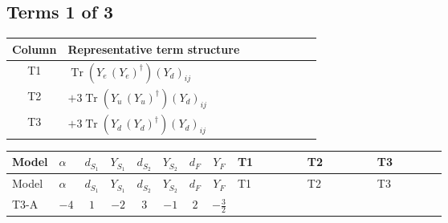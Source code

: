\documentclass[8pt]{article}
\begin{document}
\begin{landscape}
\subsection*{Terms 1 of 3}
\begin{center}
\begin{tabular}{@{}c >{\raggedright\arraybackslash}p{0.82\linewidth}@{}}
\toprule
Column & Representative term structure \\
\midrule
T1 & \(\displaystyle \operatorname{Tr}\!\left({Y_e}\,\left({Y_e}\right)^{\dagger}\right) \left({Y_d}\right)_{ij}\) \\
\midrule
T2 & \(\displaystyle +3 \operatorname{Tr}\!\left({Y_u}\,\left({Y_u}\right)^{\dagger}\right) \left({Y_d}\right)_{ij}\) \\
\midrule
T3 & \(\displaystyle +3 \operatorname{Tr}\!\left({Y_d}\,\left({Y_d}\right)^{\dagger}\right) \left({Y_d}\right)_{ij}\) \\
\midrule
\bottomrule
\end{tabular}
\end{center}
\smallskip
\tiny
\begin{longtable}{@{}llcccccc >{\raggedright\arraybackslash}p{0.21\linewidth} >{\raggedright\arraybackslash}p{0.21\linewidth} >{\raggedright\arraybackslash}p{0.21\linewidth}@{}}
\toprule
Model & $\alpha$ & $d_{S_1}$ & $Y_{S_1}$ & $d_{S_2}$ & $Y_{S_2}$ & $d_F$ & $Y_F$ & T1 & T2 & T3 \\
\midrule
\endfirsthead
\toprule
Model & $\alpha$ & $d_{S_1}$ & $Y_{S_1}$ & $d_{S_2}$ & $Y_{S_2}$ & $d_F$ & $Y_F$ & T1 & T2 & T3 \\
\midrule
\endhead
T3-A & $-4$ & $1$ & $-2$ & $3$ & $-1$ & $2$ & $-\frac{3}{2}$ & \scriptsize\adjustbox{max width=\linewidth}{$\begin{gathered} \operatorname{Tr}\!\left({Y_e}\,\left({Y_e}\right)^{\dagger}\right) \left({Y_d}\right)_{ij}\end{gathered}$} & \scriptsize\adjustbox{max width=\linewidth}{$\begin{gathered} +3 \operatorname{Tr}\!\left({Y_u}\,\left({Y_u}\right)^{\dagger}\right) \left({Y_d}\right)_{ij}\end{gathered}$} & \scriptsize\adjustbox{max width=\linewidth}{$\begin{gathered} +3 \operatorname{Tr}\!\left({Y_d}\,\left({Y_d}\right)^{\dagger}\right) \left({Y_d}\right)_{ij}\end{gathered}$} \\
\midrule

\end{longtable}
\end{landscape}
\end{document}
